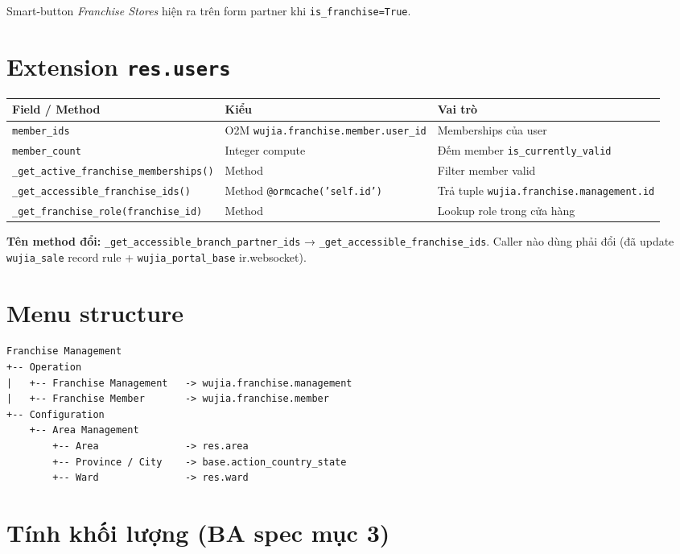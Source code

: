 Smart-button \emph{Franchise Stores} hiện ra trên form partner khi \texttt{is\_franchise=True}.

\section{Extension \texttt{res.users}}

\begin{longtable}{p{4cm} p{4cm} p{7cm}}
\toprule
\textbf{Field / Method} & \textbf{Kiểu} & \textbf{Vai trò} \\
\midrule
\endhead
\texttt{member\_ids} & O2M \texttt{wujia.franchise.member.user\_id} & Memberships của user \\
\texttt{member\_count} & Integer compute & Đếm member \texttt{is\_currently\_valid} \\
\texttt{\_get\_active\_franchise\_memberships()} & Method & Filter member valid \\
\texttt{\_get\_accessible\_franchise\_ids()} & Method \texttt{@ormcache('self.id')} & Trả tuple \texttt{wujia.franchise.management.id} \\
\texttt{\_get\_franchise\_role(franchise\_id)} & Method & Lookup role trong cửa hàng \\
\bottomrule
\end{longtable}

\textbf{Tên method đổi:} \texttt{\_get\_accessible\_branch\_partner\_ids} → \texttt{\_get\_accessible\_franchise\_ids}. Caller nào dùng phải đổi (đã update \texttt{wujia\_sale} record rule + \texttt{wujia\_portal\_base} ir.websocket).

\section{Menu structure}

\begin{lstlisting}[style=shell]
Franchise Management
+-- Operation
|   +-- Franchise Management   -> wujia.franchise.management
|   +-- Franchise Member       -> wujia.franchise.member
+-- Configuration
    +-- Area Management
        +-- Area               -> res.area
        +-- Province / City    -> base.action_country_state
        +-- Ward               -> res.ward
\end{lstlisting}

\section{Tính khối lượng (BA spec mục 3)}

